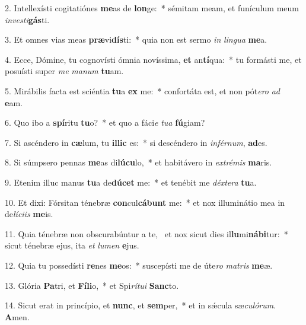 2. Intellexísti cogitatiónes \textbf{me}as de \textbf{lon}ge:~*  sémitam meam, et funículum meum \textit{in}\textit{ves}\textit{ti}\textbf{gás}ti.\

3. Et omnes vias meas \textbf{præ}vi\textbf{dís}ti:~*  quia non est sermo \textit{in} \textit{lin}\textit{gua} \textbf{me}a.\

4. Ecce, Dómine, tu cognovísti ómnia novíssima, \textbf{et} an\textbf{tí}qua:~*  tu formásti me, et posuísti super \textit{me} \textit{ma}\textit{num} \textbf{tu}am.\

5. Mirábilis facta est sciéntia \textbf{tu}a \textbf{ex} me:~*  confortáta est, et non pót\textit{e}\textit{ro} \textit{ad} \textbf{e}am.\

6. Quo ibo a \textbf{spí}ritu \textbf{tu}o?~*  et quo a fáci\textit{e} \textit{tu}\textit{a} \textbf{fú}giam?\

7. Si ascéndero in \textbf{cæ}lum, tu \textbf{il}\textbf{lic} es:~*  si descéndero in \textit{in}\textit{fér}\textit{num}, \textbf{ad}es.\

8. Si súmpsero pennas \textbf{me}as di\textbf{lú}\textbf{cu}lo,~*  et habitávero in \textit{ex}\textit{tré}\textit{mis} \textbf{ma}ris.\

9. Etenim illuc manus \textbf{tu}a de\textbf{dú}\textbf{cet} me:~*  et tenébit me \textit{déx}\textit{te}\textit{ra} \textbf{tu}a.\

10. Et dixi: Fórsitan ténebræ \textbf{con}cul\textbf{cá}\textbf{bunt} me:~*  et nox illuminátio mea in de\textit{lí}\textit{ci}\textit{is} \textbf{me}is.\

11. Quia ténebræ non obscurabúntur a te, \dag\  et nox sicut dies il\textbf{lu}mi\textbf{ná}\textbf{bi}tur:~*  sicut ténebræ ejus, ita \textit{et} \textit{lu}\textit{men} \textbf{e}jus.\

12. Quia tu possedísti \textbf{re}nes \textbf{me}os:~*  suscepísti me de úte\textit{ro} \textit{ma}\textit{tris} \textbf{me}æ.\

13. Glória \textbf{Pa}tri, et \textbf{Fí}\textbf{li}o,~*  et Spi\textit{rí}\textit{tu}\textit{i} \textbf{Sanc}to.\

14. Sicut erat in princípio, et \textbf{nunc}, et \textbf{sem}per,~*  et in sǽcula sæ\textit{cu}\textit{ló}\textit{rum}. \textbf{A}men.\

